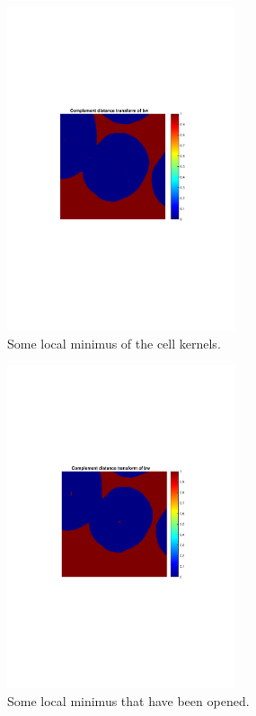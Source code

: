 \documentclass[10pt,twocolumn]{article}
\begin{document}
\begin{figure}[ht]
\centering
\includegraphics[width=0.6\textwidth]{Bilder/MinimumValusZoomedIn.pdf}
\caption{Some local minimus of the cell kernels.}
\label{fig:CellKernelsMinimum}
\end{figure}

\begin{figure}[ht]
\centering
\includegraphics[width=0.6\textwidth]{Bilder/MinimumValesOpenedZoomedIn.pdf}
\caption{Some local minimus that have been opened.}
\label{fig:CellKernelsMinimumOpened}
\end{figure}
\end{document}
